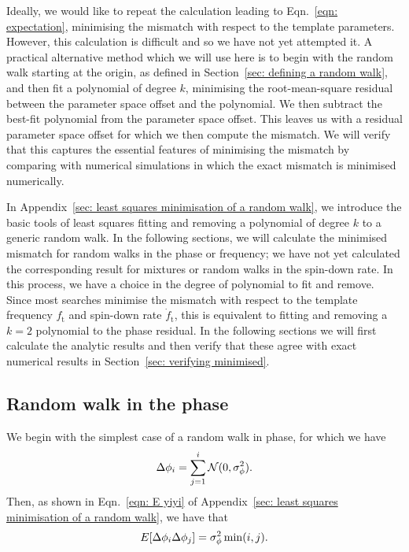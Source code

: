 \documentclass[../full_thesis/full_thesis.tex]{subfiles}
\begin{document}
Ideally, we would like to repeat the calculation leading to Eqn.~\eqref{eqn:
expectation}, minimising the mismatch with respect to the template parameters.
However, this calculation is difficult and so we have not yet attempted it.  A
practical alternative method which we will use here is to begin with the random
walk starting at the origin, as defined in Section~\ref{sec: defining a random
walk}, and then fit a polynomial of degree $k$, minimising the root-mean-square
residual between the parameter space offset and the polynomial. We then
subtract the best-fit polynomial from the parameter space offset. This leaves
us with a residual parameter space offset for which we then compute the
mismatch. We will verify that this captures the essential features of
minimising the mismatch by comparing with numerical simulations in which the
exact mismatch is minimised numerically.

In Appendix~\ref{sec: least squares minimisation of a random walk}, we
introduce the basic tools of least squares fitting and removing a polynomial of
degree $k$ to a generic random walk. In the following sections, we will
calculate the minimised mismatch for random walks in the phase or frequency; we
have not yet calculated the corresponding result for mixtures or random walks
in the spin-down rate. In this process, we have a choice in the degree of
polynomial to fit and remove. Since most searches minimise the mismatch with
respect to the template frequency $f_\textrm{t}$ and spin-down rate
$\dot{f}_{\textrm{t}}$, this is equivalent to fitting and removing a $k=2$
polynomial to the phase residual. In the following sections we will first
calculate the analytic results and then verify that these agree with exact
numerical results in Section~\ref{sec: verifying minimised}.

\subsection{Random walk in the phase}
\label{sec: minimised rw in phase}
We begin with the simplest case of a random walk in phase, for which we have
\begin{equation}
\Delta\phi_{i} = \sum_{j=1}^{i}\mathcal{N}(0, \sigma_{\phi}^{2}).
\end{equation}
Then, as shown in Eqn.~\eqref{eqn: E yiyi} of Appendix~\ref{sec: least squares
minimisation of a random walk}, we have that
\begin{equation}
E[\Delta\phi_{i} \Delta\phi_{j}] = \sigma_{\phi}^{2} \min(i, j).
\end{equation}
\end{document}
